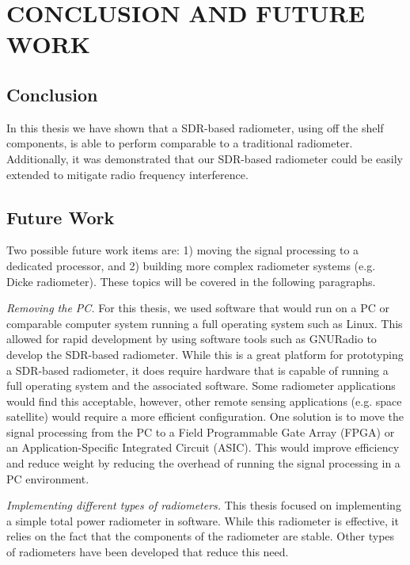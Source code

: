 
\chapter{CONCLUSION AND FUTURE WORK} \label{ch:conclusion}

\section{Conclusion}
In this thesis we have shown that a SDR-based radiometer, using off the shelf components, is able to perform comparable to a traditional radiometer.  Additionally, it was demonstrated that our SDR-based radiometer could be easily extended to mitigate radio frequency interference.   

\section{Future Work}\label{Futurework}

Two possible future work items are: 1) moving the signal processing to a dedicated processor, and 2) building more complex radiometer systems (e.g. Dicke radiometer).  These topics will be covered in the following paragraphs.   

\emph{Removing the PC.}  For this thesis, we used software that would run on a PC or comparable computer system running a full operating system such as Linux.  This allowed for rapid development by using software tools such as GNURadio to develop the SDR-based radiometer.  While this is a great platform for prototyping a SDR-based radiometer, it does require hardware that is capable of running a full operating system and the associated software.  Some radiometer applications would find this acceptable, however, other remote sensing applications (e.g. space satellite) would require a more efficient configuration.  One solution is to move the signal processing from the PC to a Field Programmable Gate Array (FPGA) or an Application-Specific Integrated Circuit (ASIC).  This would improve efficiency and reduce weight by reducing the overhead of running the signal processing in a PC environment. 

\emph{Implementing different types of radiometers.}  
This thesis focused on implementing a simple total power radiometer in software.  While this radiometer is effective, it relies on the fact that the components of the radiometer are stable.  Other types of radiometers have been developed that reduce this need.  

